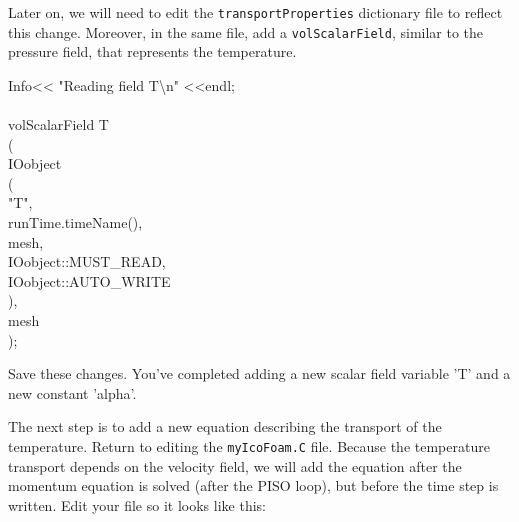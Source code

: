 \documentclass{article}
\newcommand\tab[1][0.5cm]{\hspace*{#1}}
\begin{document}
\begin{enumerate}[2.1]
\begin{myframe}
{	}
	\end{myframe}

	Later on, we will need to edit the {\tt transportProperties} dictionary file to reflect this change. Moreover, in the same file, add a {\tt volScalarField}, similar to the pressure field, that represents the temperature.
	
	\begin{myframe}
	{\tt %
		
		Info<< "Reading field T\textbackslash n" <<endl; \\
		\\
		volScalarField T\\
		(\\
		\tab IOobject \\
		\tab ( \\
		\tab \tab "T",\\
		\tab \tab runTime.timeName(),\\
		\tab \tab mesh,\\
		\tab \tab IOobject::MUST\_READ,\\
		\tab \tab IOobject::AUTO\_WRITE\\
		\tab ),\\
		\tab mesh \\
		);\\
			
	}
	\end{myframe}
	
	Save these changes. You've completed adding a new scalar field variable 'T' and a new constant 'alpha'.
	
	The next step is to add a new equation describing the transport of the temperature. Return to editing the {\tt myIcoFoam.C} file. Because the temperature transport depends on the velocity field, we will add the equation after the momentum equation is solved (after the PISO loop), but before the time step is written. Edit your file so it looks like this: 
	

	\begin{myframe}
	{\tt %
		
}
\end{myframe}
\end{enumerate}
\end{document}
